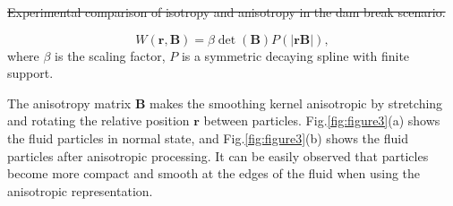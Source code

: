 \documentclass[times,twocolumn,final]{elsarticle}
\providecommand{\DIFaddtex}[1]{{\protect\color{blue}\uwave{#1}}} %
\providecommand{\DIFdeltex}[1]{{\protect\color{red}\sout{#1}}}                      %
\providecommand{\DIFaddbegin}{} %
\providecommand{\DIFaddend}{} %
\providecommand{\DIFdelend}{} %
\providecommand{\DIFdelFL}[1]{\DIFdel{#1}} %
\providecommand{\DIFadd}[1]{\texorpdfstring{\DIFaddtex{#1}}{#1}} %
\providecommand{\DIFdel}[1]{\texorpdfstring{\DIFdeltex{#1}}{}} %
\begin{document}
{%
\DIFdelFL{Experimental comparison of isotropy and anisotropy in the dam break scenario.}}

\DIFdelend \begin{equation}
W(\mathbf{r},\mathbf{B})=\beta \operatorname{det}(\mathbf{B}) P(|\mathbf{r}\mathbf{B}|),
\label{con:equa10}
\end{equation}
where $\beta$ is the scaling factor, $P$ is a symmetric decaying spline with finite support.

The anisotropy matrix $\mathbf{B}$ makes the smoothing kernel anisotropic by stretching and rotating the relative position $\mathbf{r}$ between particles. Fig.\ref{fig:figure3}(a) shows the fluid particles in \DIFaddbegin \DIFadd{the }\DIFaddend normal state, and Fig.\ref{fig:figure3}(b) shows the fluid particles after anisotropic processing. It can be easily observed that particles become more compact and smooth at the edges of the fluid when using the anisotropic representation.
\end{document}
